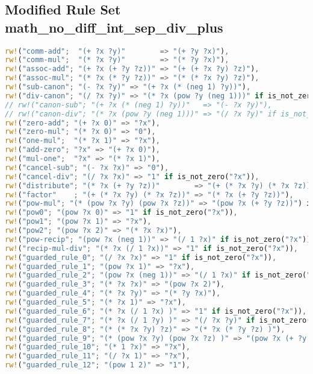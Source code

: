 \subsection{Modified Rule Set math\_no\_diff\_int\_sep\_div\_plus}
\label{app:no_diff_int_sep_div_plus}
\begin{lstlisting}[language=Rust, caption={Rule set \ref{app:no_diff_int_sep_div} with seperately completed rules for division, including intermediate rules deleted during completion.}, label={lst:no_diff_int_sep_div_plus}]
rw!("comm-add";  "(+ ?x ?y)"        => "(+ ?y ?x)"),
rw!("comm-mul";  "(* ?x ?y)"        => "(* ?y ?x)"),
rw!("assoc-add"; "(+ ?x (+ ?y ?z))" => "(+ (+ ?x ?y) ?z)"),
rw!("assoc-mul"; "(* ?x (* ?y ?z))" => "(* (* ?x ?y) ?z)"),
rw!("sub-canon"; "(- ?x ?y)" => "(+ ?x (* (neg 1) ?y))"),
rw!("div-canon"; "(/ ?x ?y)" => "(* ?x (pow ?y (neg 1)))" if is_not_zero("?y")),
// rw!("canon-sub"; "(+ ?x (* (neg 1) ?y))"   => "(- ?x ?y)"),
// rw!("canon-div"; "(* ?x (pow ?y (neg 1)))" => "(/ ?x ?y)" if is_not_zero("?y")),
rw!("zero-add"; "(+ ?x 0)" => "?x"),
rw!("zero-mul"; "(* ?x 0)" => "0"),
rw!("one-mul";  "(* ?x 1)" => "?x"),
rw!("add-zero"; "?x" => "(+ ?x 0)"),
rw!("mul-one";  "?x" => "(* ?x 1)"),
rw!("cancel-sub"; "(- ?x ?x)" => "0"),
rw!("cancel-div"; "(/ ?x ?x)" => "1" if is_not_zero("?x")),
rw!("distribute"; "(* ?x (+ ?y ?z))"        => "(+ (* ?x ?y) (* ?x ?z))"),
rw!("factor"    ; "(+ (* ?x ?y) (* ?x ?z))" => "(* ?x (+ ?y ?z))"),
rw!("pow-mul"; "(* (pow ?x ?y) (pow ?x ?z))" => "(pow ?x (+ ?y ?z))") if is_not_zero("?x"),
rw!("pow0"; "(pow ?x 0)" => "1" if is_not_zero("?x")),
rw!("pow1"; "(pow ?x 1)" => "?x"),
rw!("pow2"; "(pow ?x 2)" => "(* ?x ?x)"),
rw!("pow-recip"; "(pow ?x (neg 1))" => "(/ 1 ?x)" if is_not_zero("?x")),
rw!("recip-mul-div"; "(* ?x (/ 1 ?x))" => "1" if is_not_zero("?x")),
rw!("guarded_rule_0"; "(/ ?x ?x)" => "1" if is_not_zero("?x")),
rw!("guarded_rule_1"; "(pow ?x 1)" => "?x"),
rw!("guarded_rule_2"; "(pow ?x (neg 1))" => "(/ 1 ?x)" if is_not_zero("?x")),
rw!("guarded_rule_3"; "(* ?x ?x)" => "(pow ?x 2)"),
rw!("guarded_rule_4"; "(* ?x ?y)" => "(* ?y ?x)"),
rw!("guarded_rule_5"; "(* ?x 1)" => "?x"),
rw!("guarded_rule_6"; "(* ?x (/ 1 ?x) )" => "1" if is_not_zero("?x")),
rw!("guarded_rule_7"; "(* ?x (/ 1 ?y) )" => "(/ ?x ?y)" if is_not_zero("?y")),
rw!("guarded_rule_8"; "(* (* ?x ?y) ?z)" => "(* ?x (* ?y ?z) )"),
rw!("guarded_rule_9"; "(* (pow ?x ?y) (pow ?x ?z) )" => "(pow ?x (+ ?y ?z) )" if is_not_zero("?x")),
rw!("guarded_rule_10"; "(* 1 ?x)" => "?x"),
rw!("guarded_rule_11"; "(/ ?x 1)" => "?x"),
rw!("guarded_rule_12"; "(pow 1 2)" => "1"),

\end{lstlisting}
